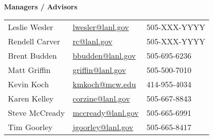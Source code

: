 
\begin{minipage}{0.45\textwidth} 
\begin{center}
{\normalsize \textbf{Managers / Advisors}}
\end{center}
\begin{tabular}{lll|}
	Leslie Wesler &   \href{mailto:lwesler@lanl.gov}{lwesler@lanl.gov} & 505-XXX-YYYY \\
	Rendell Carver &   \href{mailto:rc@lanl.gov}{rc@lanl.gov} & 505-XXX-YYYY \\
	Brent Budden & \href{mailto:bbudden@lanl.gov}{bbudden@lanl.gov} & 505-695-6236 \\
	Matt Griffin &  \href{mailto:griffin@lanl.gov}{griffin@lanl.gov} & 505-500-7010 \\
	Kevin Koch & \href{mailto:kmkoch@mcw.edu}{kmkoch@mcw.edu} & 414-955-4034 \\
	Karen Kelley &  \href{mailto:corzine@lanl.gov}{corzine@lanl.gov} & 505-667-8843 \\
	Steve McCready & \href{mailto:mccready@lanl.gov}{mccready@lanl.gov} & 505-665-6991 \\
	Tim Goorley & \href{mailto:jgoorley@lanl.gov}{jgoorley@lanl.gov} & 505-665-8417 \\
\end{tabular}
\end{minipage}%
\hspace{2mm}
